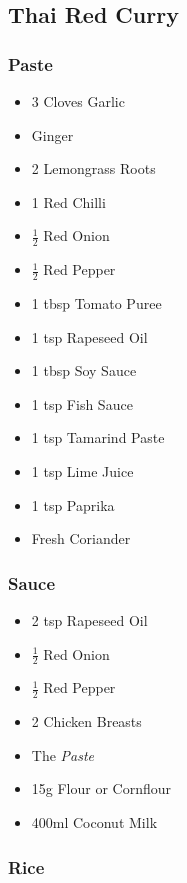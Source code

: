 \documentclass[11pt, english]{article}
\begin{document}
\newpage

	\subsection{Thai Red Curry}

		\subsubsection*{Paste}

	\begin{itemize}
        \setlength\itemsep{0cm}
                \item 3 Cloves Garlic
		\item Ginger
		\item 2 Lemongrass Roots
		\item 1 Red Chilli
		\item $\frac{1}{2}$ Red Onion
		\item $\frac{1}{2}$ Red Pepper
		\item 1 tbsp Tomato Puree
		\item 1 tsp Rapeseed Oil
		\item 1 tbsp Soy Sauce
		\item 1 tsp Fish Sauce
		\item 1 tsp Tamarind Paste
		\item 1 tsp Lime Juice
		\item 1 tsp Paprika
		\item Fresh Coriander
        \end{itemize}

		\subsubsection*{Sauce}

	\begin{itemize}
        \setlength\itemsep{0cm}
                \item 2 tsp Rapeseed Oil
		\item $\frac{1}{2}$ Red Onion
		\item $\frac{1}{2}$ Red Pepper
		\item 2 Chicken Breasts
		\item The \textit{Paste}
		\item 15g Flour or Cornflour
		\item 400ml Coconut Milk
        \end{itemize}

		\subsubsection*{Rice}
\end{document}
